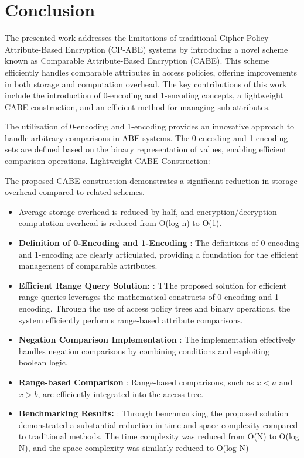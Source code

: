 \chapter*{Conclusion}


The presented work addresses the limitations of traditional Cipher Policy Attribute-Based Encryption (CP-ABE) systems by introducing a novel scheme known as Comparable Attribute-Based Encryption (CABE). This scheme efficiently handles comparable attributes in access policies, offering improvements in both storage and computation overhead. The key contributions of this work include the introduction of 0-encoding and 1-encoding concepts, a lightweight CABE construction, and an efficient method for managing sub-attributes.

The utilization of 0-encoding and 1-encoding provides an innovative approach to handle arbitrary comparisons in ABE systems.
The 0-encoding and 1-encoding sets are defined based on the binary representation of values, enabling efficient comparison operations.
Lightweight CABE Construction:

The proposed CABE construction demonstrates a significant reduction in storage overhead compared to related schemes.
\begin{itemize}
    \item Average storage overhead is reduced by half, and encryption/decryption computation overhead is reduced from O(log n) to O(1).
    \item \textbf{ Definition of 0-Encoding and 1-Encoding } : The definitions of 0-encoding and 1-encoding are clearly articulated, providing a foundation for the efficient management of comparable attributes.
    \item \textbf{ Efficient Range Query Solution: } : TThe proposed solution for efficient range queries leverages the mathematical constructs of 0-encoding and 1-encoding. Through the use of access policy trees and binary operations, the system efficiently performs range-based attribute comparisons.
      \item \textbf{ Negation Comparison Implementation } : The implementation effectively handles negation comparisons by combining conditions and exploiting boolean logic.
       \item \textbf{ Range-based Comparison } : Range-based comparisons, such as  \( x<a\) and  \(x>b\), are efficiently integrated into the access tree.
         \item \textbf{ Benchmarking Results: } : Through benchmarking, the proposed solution demonstrated a substantial reduction in time and space complexity compared to traditional methods. The time complexity was reduced from O(N) to O(log N), and the space complexity was similarly reduced to O(log N)

\end{itemize}










